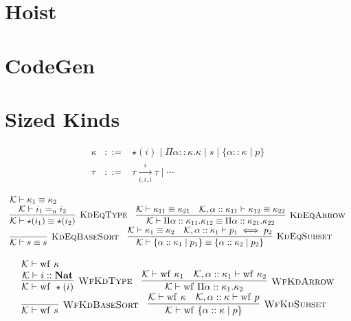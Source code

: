 \documentclass[fleqn]{article}
\begin{document}
\section{Hoist}

\section{CodeGen}

\section{Sized Kinds}

\[
\begin{array}{rcl}
	\kappa & ::= & \star(i) \mid \Pi \alpha :: \kappa. \kappa \mid s \mid \{ \alpha :: \kappa \mid p \} \\
	\tau & ::= & \tau \xrightarrow[i,i,i]{i} \tau \mid \cdots
\end{array}
\]

\[
\begin{array}{l}
	\mathcal{K} \vdash \kappa_1 \equiv \kappa_2 \\
	\infer[\textsc{KdEqType}]{\mathcal{K} \vdash \star(i_1) \equiv \star(i_2)}{\mathcal{K} \vdash i_1 =_n i_2} \hspace{1em}
	\infer[\textsc{KdEqArrow}]{\mathcal{K} \vdash \Pi \alpha :: \kappa_{11}. \kappa_{12} \equiv \Pi \alpha :: \kappa_{21}. \kappa_{22}}{\mathcal{K} \vdash \kappa_{11} \equiv \kappa_{21} & \mathcal{K}, \alpha :: \kappa_{11} \vdash \kappa_{12} \equiv \kappa_{22}} \\
	\infer[\textsc{KdEqBaseSort}]{\mathcal{K} \vdash s \equiv s}{} \hspace{1em}
	\infer[\textsc{KdEqSubset}]{\mathcal{K} \vdash \{ \alpha :: \kappa_1 \mid p_1 \} \equiv \{ \alpha :: \kappa_2 \mid p_2 \} }{\mathcal{K} \vdash \kappa_1 \equiv \kappa_2 & \mathcal{K},\alpha::\kappa_1 \vdash p_1 \iff p_2}
\end{array}
\]

\[
\begin{array}{l}
	\mathcal{K} \vdash \mathrm{wf}~\kappa \\
	\infer[\textsc{WfKdType}]{\mathcal{K} \vdash \mathrm{wf}~\star(i)}{\mathcal{K} \vdash i :: \mathbf{Nat}} \hspace{1em}
	\infer[\textsc{WfKdArrow}]{\mathcal{K} \vdash \mathrm{wf}~\Pi \alpha :: \kappa_1. \kappa_2}{\mathcal{K} \vdash \mathrm{wf}~\kappa_1 & \mathcal{K},\alpha::\kappa_1 \vdash \mathrm{wf}~\kappa_2} \\
	\infer[\textsc{WfKdBaseSort}]{\mathcal{K} \vdash \mathrm{wf}~s}{} \hspace{1em}
	\infer[\textsc{WfKdSubset}]{\mathcal{K} \vdash \mathrm{wf}~\{  \alpha :: \kappa \mid p \}}{\mathcal{K} \vdash \mathrm{wf}~\kappa & \mathcal{K},\alpha::\kappa \vdash \mathrm{wf}~p}
\end{array}
\]
\end{document}
